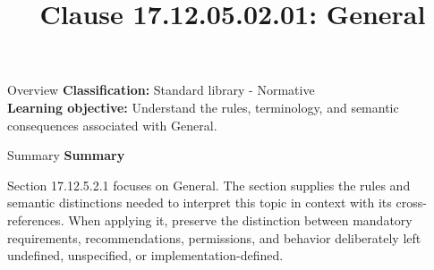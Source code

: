 \documentclass[10pt,letterpaper]{article}
\title{Clause 17.12.05.02.01: General}
\author{}
\date{}
\begin{document}
\maketitle
\begin{CornellOverviewBox}{Overview}
\textbf{Classification:} Standard library - Normative\\[2pt]
\textbf{Learning objective:} Understand the rules, terminology, and semantic consequences associated with General.
\end{CornellOverviewBox}\begin{CornellSummaryBox}{Summary}
{\sffamily\bfseries\color{Accent} Summary}\par\vspace{3pt}Section 17.12.5.2.1 focuses on General. The section supplies the rules and semantic distinctions needed to interpret this topic in context with its cross-references. When applying it, preserve the distinction between mandatory requirements, recommendations, permissions, and behavior deliberately left undefined, unspecified, or implementation-defined.
\end{CornellSummaryBox}
\end{document}
